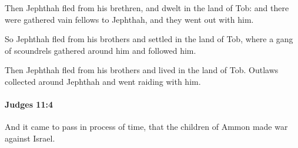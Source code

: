 			\begin{versebox}
					\item[BHS] 
					\item[ASV] Then Jephthah fled from his brethren, and dwelt in the land of Tob: and there were gathered vain fellows to Jephthah, and they went out with him.
					\item[NIV] So Jephthah fled from his brothers and settled in the land of Tob, where a gang of scoundrels gathered around him and followed him.
					\item[NRSV] Then Jephthah fled from his brothers and lived in the land of Tob. Outlaws collected around Jephthah and went raiding with him.
			\end{versebox}

		\paragraph{Judges 11:4} %
			\label{JUDGES-11-4}

			And it came to pass in process of time, that the children of Ammon made war against Israel.

